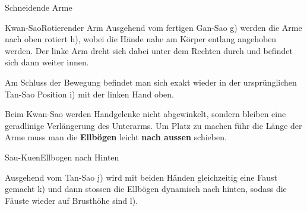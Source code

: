 \begin{WTSatz}{Schneidende Arme}
\begin{WTSatzTeil}{Kwan-Sao}{Rotierender Arm}
		Ausgehend vom fertigen Gan-Sao g) werden die Arme nach oben rotiert h), wobei die H\"ande nahe am K\"orper entlang angehoben werden. Der linke Arm dreht sich dabei unter dem Rechten durch und befindet sich dann weiter innen.
		
		Am Schluss der Bewegung befindet man sich exakt wieder in der urspr\"unglichen Tan-Sao Position i) mit der linken Hand oben.
		
		\begin{WTCommonNoob}
			Beim Kwan-Sao werden Handgelenke nicht abgewinkelt, sondern bleiben eine geradlinige Verl\"angerung des Unterarms. Um Platz zu machen f\"uhr die L\"ange der Arme muss man die \textbf{Ellb\"ogen} leicht \textbf{nach aussen} schieben.
		\end{WTCommonNoob}
	\end{WTSatzTeil}
	
	\begin{WTSatzTeil}{Sau-Kuen}{Ellbogen nach Hinten}
		
		Ausgehend vom Tan-Sao j) wird mit beiden H\"anden gleichzeitig eine Faust gemacht k) und dann stossen die Ellb\"ogen dynamisch nach hinten, sodass die F\"auste wieder auf Brusth\"ohe sind l).
	\end{WTSatzTeil}
	
\end{WTSatz}


